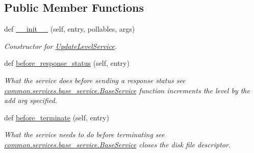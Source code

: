 \subsection*{Public Member Functions}
\begin{DoxyCompactItemize}
\item 
def \hyperlink{class_r_a_i_d5_1_1block__device_1_1services_1_1update__level__service_1_1_update_level_service_a09441a50f9cb4c0f0c84918430f60aec}{\+\_\+\+\_\+init\+\_\+\+\_\+} (self, entry, pollables, args)
\begin{DoxyCompactList}\small\item\em Constructor for \hyperlink{class_r_a_i_d5_1_1block__device_1_1services_1_1update__level__service_1_1_update_level_service}{Update\+Level\+Service}. \end{DoxyCompactList}\item 
def \hyperlink{class_r_a_i_d5_1_1block__device_1_1services_1_1update__level__service_1_1_update_level_service_a6ce7ce675536e8bb3af37cc1755806a0}{before\+\_\+response\+\_\+status} (self, entry)
\begin{DoxyCompactList}\small\item\em What the service does before sending a response status see \hyperlink{class_r_a_i_d5_1_1common_1_1services_1_1base__service_1_1_base_service}{common.\+services.\+base\+\_\+service.\+Base\+Service} function increments the level by the add arg specified. \end{DoxyCompactList}\item 
\mbox{\label{class_r_a_i_d5_1_1block__device_1_1services_1_1update__level__service_1_1_update_level_service_a95df2438df37413be715f3b846e2a0ec}} 
def \hyperlink{class_r_a_i_d5_1_1block__device_1_1services_1_1update__level__service_1_1_update_level_service_a95df2438df37413be715f3b846e2a0ec}{before\+\_\+terminate} (self, entry)
\begin{DoxyCompactList}\small\item\em What the service needs to do before terminating see \hyperlink{class_r_a_i_d5_1_1common_1_1services_1_1base__service_1_1_base_service}{common.\+services.\+base\+\_\+service.\+Base\+Service} closes the disk file descriptor. \end{DoxyCompactList}\end{DoxyCompactItemize}
